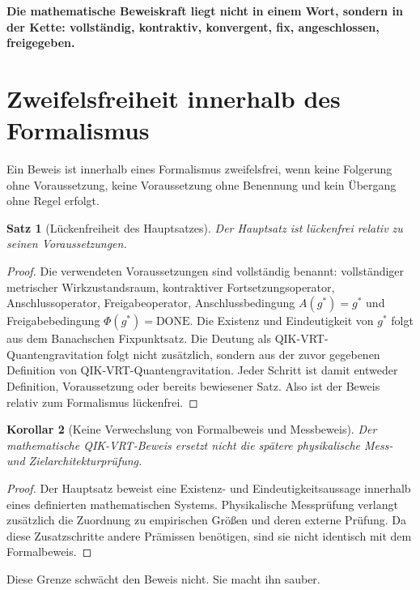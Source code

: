 \documentclass[11pt,a4paper,oneside]{scrartcl}
\theoremstyle{qikstyle}
\newtheorem{satz}{Satz}[section]
\newtheorem{korollar}[satz]{Korollar}
\newcommand{\DONE}{\mathrm{DONE}}
\newcommand{\Phiop}{\Phi}
\newenvironment{merksatz}{\begin{center}\begin{minipage}{0.92\linewidth}\sffamily\bfseries}{\end{minipage}\end{center}}
\begin{document}
\begin{merksatz}
Die mathematische Beweiskraft liegt nicht in einem Wort, sondern in der Kette: vollständig, kontraktiv, konvergent, fix, angeschlossen, freigegeben.
\end{merksatz}
\newpage

\section{Zweifelsfreiheit innerhalb des Formalismus}

Ein Beweis ist innerhalb eines Formalismus zweifelsfrei, wenn keine Folgerung ohne Voraussetzung, keine Voraussetzung ohne Benennung und kein Übergang ohne Regel erfolgt.

\begin{satz}[Lückenfreiheit des Hauptsatzes]
Der Hauptsatz ist lückenfrei relativ zu seinen Voraussetzungen.
\end{satz}

\begin{proof}
Die verwendeten Voraussetzungen sind vollständig benannt: vollständiger metrischer Wirkzustandsraum, kontraktiver Fortsetzungsoperator, Anschlussoperator, Freigabeoperator, Anschlussbedingung \(A(g^*)=g^*\) und Freigabebedingung \(\Phiop(g^*)=\DONE\). Die Existenz und Eindeutigkeit von \(g^*\) folgt aus dem Banachschen Fixpunktsatz. Die Deutung als QIK-VRT-Quantengravitation folgt nicht zusätzlich, sondern aus der zuvor gegebenen Definition von QIK-VRT-Quantengravitation. Jeder Schritt ist damit entweder Definition, Voraussetzung oder bereits bewiesener Satz. Also ist der Beweis relativ zum Formalismus lückenfrei.
\end{proof}

\begin{korollar}[Keine Verwechslung von Formalbeweis und Messbeweis]
Der mathematische QIK-VRT-Beweis ersetzt nicht die spätere physikalische Mess- und Zielarchitekturprüfung.
\end{korollar}

\begin{proof}
Der Hauptsatz beweist eine Existenz- und Eindeutigkeitsaussage innerhalb eines definierten mathematischen Systems. Physikalische Messprüfung verlangt zusätzlich die Zuordnung zu empirischen Größen und deren externe Prüfung. Da diese Zusatzschritte andere Prämissen benötigen, sind sie nicht identisch mit dem Formalbeweis.
\end{proof}

Diese Grenze schwächt den Beweis nicht. Sie macht ihn sauber.
\newpage
\end{document}
